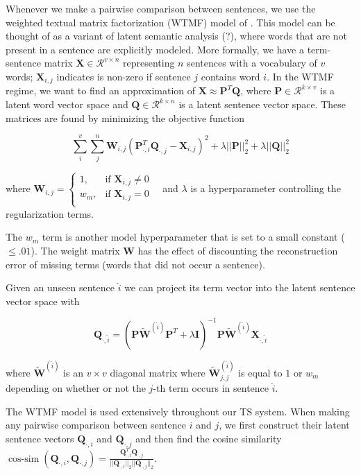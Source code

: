 \documentclass{sig-alternate}
\begin{document}
Whenever we make a pairwise comparison between sentences, we use the weighted
textual matrix factorization (WTMF) model of \cite{guo2012simple}. This 
model can be thought of as a variant of latent semantic analysis (?), 
where words that are not present in a sentence are explicitly modeled.
More formally, we have a term-sentence matrix 
$\mathbf{X}\in\mathcal{R}^{v \times n}$ representing $n$ sentences with a 
vocabulary of $v$ words; $\mathbf{X}_{i,j}$ indicates is non-zero if sentence
$j$ contains word $i$. In the WTMF regime, we want to find an approximation
of $\mathbf{X} \approx \mathbf{P}^T\mathbf{Q}$, where 
$\mathbf{P} \in \mathcal{R}^{k \times v}$ is a latent word vector space and
$\mathbf{Q} \in \mathcal{R}^{k \times n}$ is a latent sentence vector
space. These matrices are found by minimizing the objective function

$$\sum_i^v \sum_j^n \mathbf{W}_{i,j}(\mathbf{P}_{\cdot,i}^T
\mathbf{Q}_{\cdot,j} 
- \mathbf{X}_{i,j})^2 
 + \lambda ||\mathbf{P}||_2^2 + \lambda ||\mathbf{Q}||_2^2$$

where $\mathbf{W}_{i,j} = 
\begin{cases} 1, & \textrm{if $\mathbf{X}_{i,j} \ne 0$ } \\
w_m, & \textrm{if $\mathbf{X}_{i,j} = 0$ }\\
\end{cases}$
and $\lambda$ is a hyperparameter controlling the regularization terms.

The $w_m$ term is another model hyperparameter that is set to a small constant
($\le .01$). The weight matrix $\mathbf{W}$ has the effect of discounting the
reconstruction error of missing terms (words that did not occur a sentence).

Given an unseen sentence $\hat{i}$ we can project its term vector into the
latent sentence vector space with 

$$
\mathbf{Q}_{\cdot,\hat{i}} = (\mathbf{P}\mathbf{\tilde{W}}^{(\hat{i})}
\mathbf{P}^T  + \lambda\mathbf{I} )^{-1} 
\mathbf{P}\mathbf{\tilde{W}}^{(\hat{i})} \mathbf{X}_{\cdot, \hat{i}}
$$  

where $\mathbf{\tilde{W}}^{(\hat{i})}$ is an $v\times v$ diagonal matrix
where $\mathbf{\tilde{W}}^{(\hat{i})}_{j,j}$ is equal to $1$ or $w_m$ 
depending on whether or not the $j$-th term occurs in sentence $\hat{i}$.


The WTMF model is used extensively throughout our TS system. When making any 
pairwise comparison between sentence $i$ and $j$, we first construct
their latent sentence vectors $\mathbf{Q}_{\cdot,i}$ and
$\mathbf{Q}_{\cdot,j}$ and then find the cosine similarity 
$\displaystyle \operatorname{cos-sim}
(\mathbf{Q}_{\cdot,i}, \mathbf{Q}_{\cdot,j}) = 
\frac{\mathbf{Q}_{\cdot,i}^T\mathbf{Q}_{\cdot,j}}{||\mathbf{Q}_{\cdot,i}||_2
||\mathbf{Q}_{\cdot,j}||_2   }$.
\end{document}
